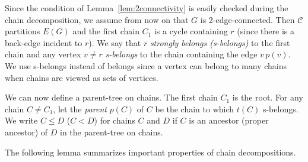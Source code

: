 \documentclass[paper=a4]{scrartcl}
\newcommand{\C}{\ensuremath{\mathcal{C}}}
\newcommand{\edge}[2]{\ensuremath{#1\,#2}}
\begin{document}
Since the condition of Lemma~\ref{lem:2connectivity} is easily checked during the chain decomposition, we assume from now on that $G$ is 2-edge-connected. Then $\C$ partitions $E(G)$ and the first chain $C_1$ is a cycle containing $r$ (since there is a back-edge incident to $r$). We say that $r$ \emph{strongly belongs (s-belongs)} to the first chain and any vertex $v \neq r$ \emph{s-belongs} to the chain containing the edge $\edge{v}{p(v)}$. We use s-belongs instead of belongs since a vertex can belong to many chains when chains are viewed as sets of vertices.

We can now define a parent-tree on chains. The first chain $C_1$ is the root. For any chain $C \neq C_1$, let the \emph{parent} $p(C)$ of $C$ be the chain to which $t(C)$ s-belongs. We write $C \le D$ ($C<D$) for chains $C$ and $D$ if $C$ is an ancestor (proper ancestor) of $D$ in the parent-tree on chains.

The following lemma summarizes important properties of chain decompositions.
\end{document}
